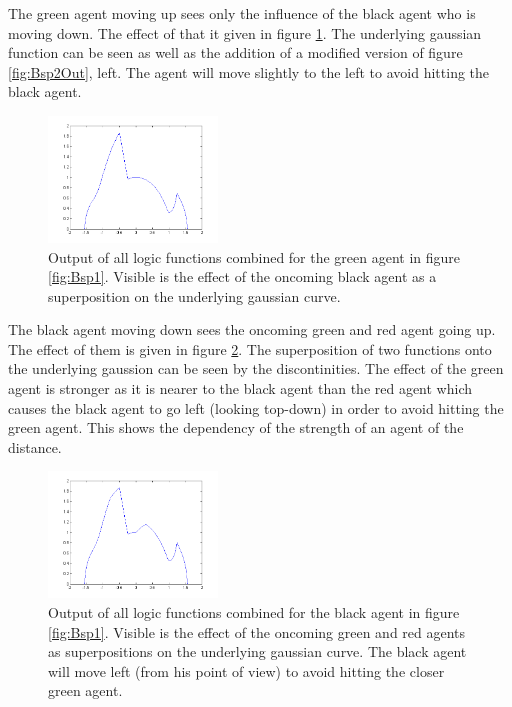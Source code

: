 \noi The green agent moving up sees only the influence of the black agent who is moving down. The effect of that it given in figure \ref{fig:Bsp1Mitte}. The underlying gaussian function can be seen as well as the addition of a modified version of figure \ref{fig:Bsp2Out}, left. The agent will move slightly to the left to avoid hitting the black agent.\\
\begin{figure}[h!]
	\centering
		\includegraphics[width=0.40\textwidth]{pictures/Bsp1Mitte}
	\caption{Output of all logic functions combined for the green agent in figure \ref{fig:Bsp1}. Visible is the effect of the oncoming black agent as a superposition on the underlying gaussian curve.}
	\label{fig:Bsp1Mitte}
\end{figure}

\noi The black agent moving down sees the oncoming green and red agent going up. The effect of them is given in figure \ref{fig:Bsp1ObenRechts}. The superposition of two functions onto the underlying gaussion can be seen by the discontinities. The effect of the green agent is stronger as it is nearer to the black agent than the red agent which causes the black agent to go left (looking top-down) in order to avoid hitting the green agent. This shows the dependency of the strength of an agent of the distance.
\begin{figure}[h!]
	\centering
		\includegraphics[width=0.40\textwidth]{pictures/Bsp1ObenRechts}
	\caption{Output of all logic functions combined for the black agent in figure \ref{fig:Bsp1}. Visible is the effect of the oncoming green and red agents as superpositions on the underlying gaussian curve. The black agent will move left (from his point of view) to avoid hitting the closer green agent.}
	\label{fig:Bsp1ObenRechts}
\end{figure}
